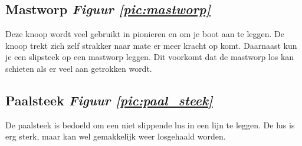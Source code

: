 \subsection{Mastworp \hfill \textit{Figuur \ref{pic:mastworp}}}
Deze knoop wordt veel gebruikt in pionieren en om je boot aan te leggen. De knoop trekt zich zelf strakker naar mate er meer kracht op komt. Daarnaast kun je een slipsteek op een mastworp leggen. Dit voorkomt dat de mastworp los kan schieten als er veel aan getrokken wordt.
\subsection{Paalsteek \hfill \textit{Figuur \ref{pic:paal_steek}}} 
De paalsteek is bedoeld om een niet slippende lus in een lijn te leggen. De lus is erg sterk, maar kan wel gemakkelijk weer losgehaald worden.
